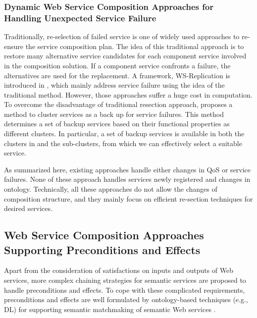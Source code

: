 \subsubsection{Dynamic Web Service Composition Approaches for Handling Unexpected Service Failure}\label{dynamicService}
Traditionally, re-selection of failed service is one of widely used approaches to re-ensure the  service composition plan. The idea of this traditional approach is to restore many alternative service candidates for each component service involved in the composition solution. If a component service confronts a failure, the alternatives are used for the replacement.  A framework, WS-Replication is introduced in \cite{salas2006ws}, which mainly address service failure using the idea of the traditional method. However, those approaches \cite{salas2006ws} suffer a huge cost in computation. To overcome the disadvantage of traditional resection approach,  \cite{wagner2016robust} proposes a method to cluster services as a back up for service failures. This method determines a set of backup services based on their functional properties as different clusters. In particular, a set of backup services is available in both the clusters in and the sub-clusters, from which we can effectively select a suitable service.

As summarized here, existing approaches handle either changes in QoS or service failures. None of these approach handles services newly registered and changes in ontology. Technically, all these approaches do not allow the changes of composition structure, and they mainly focus on efficient re-section techniques for desired services.



\subsection{Web Service Composition Approaches Supporting Preconditions and Effects}\label{Semantic}
Apart from the consideration of satisfactions on inputs and outputs of Web services, more complex chaining strategies for semantic services are proposed to handle preconditions and effects. To cope with these complicated requirements, preconditions and effects are well formulated by ontology-based techniques (e.g., DL) for supporting semantic matchmaking of semantic Web services \cite{wang2014automated}.

